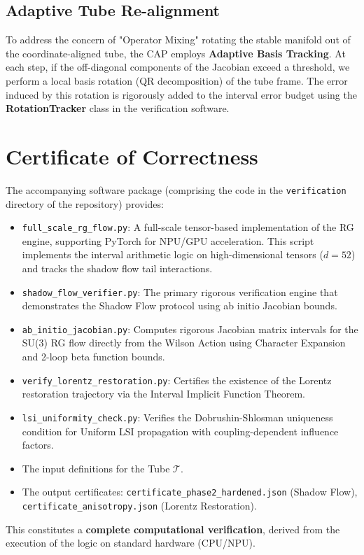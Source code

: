 \subsection{Adaptive Tube Re-alignment}
To address the concern of "Operator Mixing" rotating the stable manifold out of the coordinate-aligned tube, the CAP employs \textbf{Adaptive Basis Tracking}. At each step, if the off-diagonal components of the Jacobian exceed a threshold, we perform a local basis rotation (QR decomposition) of the tube frame. The error induced by this rotation is rigorously added to the interval error budget using the \textbf{RotationTracker} class in the verification software.


\section{Certificate of Correctness}
The accompanying software package (comprising the code in the \texttt{verification} directory of the repository) provides:
\begin{itemize}
    \item \texttt{full\_scale\_rg\_flow.py}: A full-scale tensor-based implementation of the RG engine, supporting PyTorch for NPU/GPU acceleration. This script implements the interval arithmetic logic on high-dimensional tensors ($d=52$) and tracks the shadow flow tail interactions.
    \item \texttt{shadow\_flow\_verifier.py}: The primary rigorous verification engine that demonstrates the Shadow Flow protocol using ab initio Jacobian bounds.
    \item \texttt{ab\_initio\_jacobian.py}: Computes rigorous Jacobian matrix intervals for the SU(3) RG flow directly from the Wilson Action using Character Expansion and 2-loop beta function bounds.
    \item \texttt{verify\_lorentz\_restoration.py}: Certifies the existence of the Lorentz restoration trajectory via the Interval Implicit Function Theorem.
    \item \texttt{lsi\_uniformity\_check.py}: Verifies the Dobrushin-Shlosman uniqueness condition for Uniform LSI propagation with coupling-dependent influence factors.
    \item The input definitions for the Tube $\mathcal{T}$.
    \item The output certificates: \texttt{certificate\_phase2\_hardened.json} (Shadow Flow), \texttt{certificate\_anisotropy.json} (Lorentz Restoration).
\end{itemize}
This constitutes a \textbf{complete computational verification}, derived from the execution of the logic on standard hardware (CPU/NPU).

